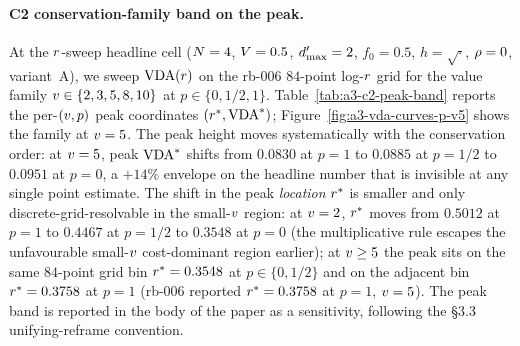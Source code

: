 \paragraph{C2 conservation-family band on the peak.}
At the $r$-sweep headline cell ($N = 4$, $V = 0.5$,
$d'_{\max} = 2$, $f_0 = 0.5$, $h = \sqrt{\cdot}$, $\rho = 0$,
variant~A), we sweep $\mathrm{VDA}(r)$ on the rb-006 $84$-point log-$r$
grid for the value family $v \in \{2, 3, 5, 8, 10\}$ at
$p \in \{0, 1/2, 1\}$. Table~\ref{tab:a3-c2-peak-band} reports the
per-$(v, p)$ peak coordinates $(r^*, \mathrm{VDA}^*)$;
Figure~\ref{fig:a3-vda-curves-p-v5} shows the family at $v = 5$.
The peak height moves systematically with the conservation order:
at $v = 5$, peak $\mathrm{VDA}^*$ shifts from $0.0830$ at $p = 1$ to
$0.0885$ at $p = 1/2$ to $0.0951$ at $p = 0$, a $+14\%$ envelope on
the headline number that is invisible at any single point estimate.
The shift in the peak \emph{location} $r^*$ is smaller and only
discrete-grid-resolvable in the small-$v$ region: at $v = 2$,
$r^*$ moves from $0.5012$ at $p = 1$ to $0.4467$ at $p = 1/2$ to
$0.3548$ at $p = 0$ (the multiplicative rule escapes the unfavourable
small-$v$ cost-dominant region earlier); at $v \ge 5$ the peak
sits on the same $84$-point grid bin $r^* = 0.3548$ at $p \in
\{0, 1/2\}$ and on the adjacent bin $r^* = 0.3758$ at $p = 1$
(rb-006 reported $r^* = 0.3758$ at $p = 1$, $v = 5$). The
peak band is reported in the body of the paper as a sensitivity,
following the §3.3 unifying-reframe convention.

